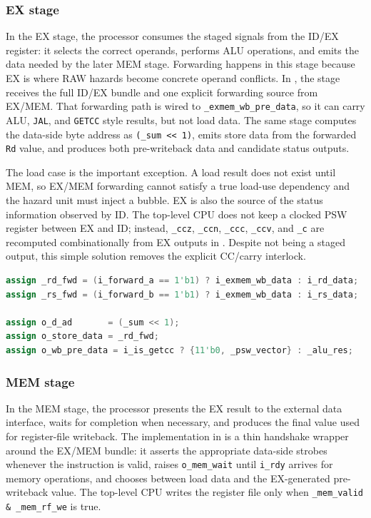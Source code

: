 \documentclass[11pt,a4paper]{article}
\begin{document}
\subsubsection{EX stage}

In the EX stage, the processor consumes the staged signals from the ID/EX register: it selects the correct operands, performs ALU operations, and emits the data needed by the later MEM stage. Forwarding happens in this stage because EX is where RAW hazards become concrete operand conflicts. In , the stage receives the full ID/EX bundle and one explicit forwarding source from EX/MEM. That forwarding path is wired to \texttt{\_exmem\_wb\_pre\_data}, so it can carry ALU, \texttt{JAL}, and \texttt{GETCC} style results, but not load data. The same stage computes the data-side byte address as \texttt{(\_sum << 1)}, emits store data from the forwarded \texttt{Rd} value, and produces both pre-writeback data and candidate status outputs.

The load case is the important exception. A load result does not exist until MEM, so EX/MEM forwarding cannot satisfy a true load-use dependency and the hazard unit must inject a bubble. EX is also the source of the status information observed by ID. The top-level CPU does not keep a clocked PSW register between EX and ID; instead, \texttt{\_ccz}, \texttt{\_ccn}, \texttt{\_ccc}, \texttt{\_ccv}, and \texttt{\_c} are recomputed combinationally from EX outputs in . Despite not being a staged output, this simple solution removes the explicit CC/carry interlock.

\begin{lstlisting}[language=Verilog,caption={Forwarding and data/result selection in \texttt{srcs/m\_ex\_stage.v}}]
assign _rd_fwd = (i_forward_a == 1'b1) ? i_exmem_wb_data : i_rd_data;
assign _rs_fwd = (i_forward_b == 1'b1) ? i_exmem_wb_data : i_rs_data;

assign o_d_ad       = (_sum << 1);
assign o_store_data = _rd_fwd;
assign o_wb_pre_data = i_is_getcc ? {11'b0, _psw_vector} : _alu_res;
\end{lstlisting}

\subsubsection{MEM stage}

In the MEM stage, the processor presents the EX result to the external data interface, waits for completion when necessary, and produces the final value used for register-file writeback. The implementation in  is a thin handshake wrapper around the EX/MEM bundle: it asserts the appropriate data-side strobes whenever the instruction is valid, raises \texttt{o\_mem\_wait} until \texttt{i\_rdy} arrives for memory operations, and chooses between load data and the EX-generated pre-writeback value. The top-level CPU writes the register file only when \texttt{\_mem\_valid \& \_mem\_rf\_we} is true.
\end{document}
